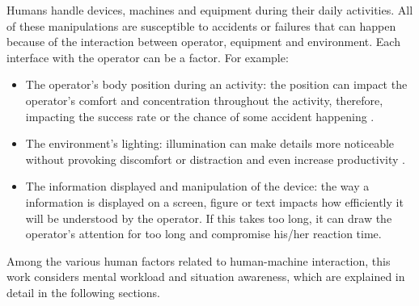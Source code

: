 Humans handle devices, machines and equipment during their daily activities. All of these manipulations are susceptible to accidents or failures that can happen because of the interaction between operator, equipment and environment. Each interface with the operator can be a factor. For example:

\begin{itemize}
    \item The operator's body position during an activity: the position can impact the operator’s comfort and concentration throughout the activity, therefore, impacting the success rate or the chance of some accident happening  \cite{sanders1998human}.
    
    \item The environment's lighting: illumination can make details more noticeable without provoking discomfort or distraction and even increase productivity  \cite{sanders1998human}.
    
    \item The information displayed and manipulation of the device: the way a information is displayed on a screen, figure or text impacts how efficiently it will be understood by the operator. If this takes too long, it can draw the operator’s attention for too long and compromise his/her reaction time.
    
\end{itemize}

Among the various human factors related to human-machine interaction, this work considers mental workload and situation awareness, which are explained in detail in the following sections.